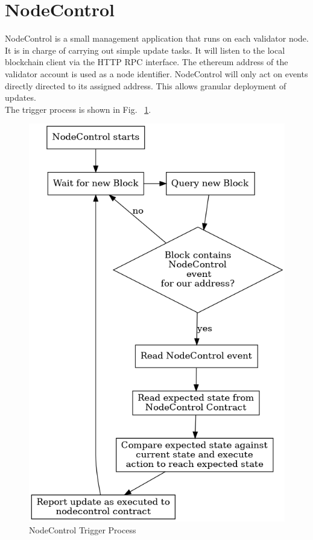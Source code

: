 \section{NodeControl}
\label{nodecontrol}

NodeControl is a small management application that runs on each validator node. It is in charge of carrying out simple update tasks.
It will listen to the local blockchain client via the HTTP RPC interface. 
The ethereum address of the validator account is used as a node identifier. NodeControl will only act on events directly directed to its assigned address.
This allows granular deployment of updates. \\

The trigger process is shown in Fig. ~\ref{fig:nctrigger}.


\begin{figure}[ht]
	\centering
    \includegraphics[height=0.65\textheight,keepaspectratio]{./images/nodecontrol.png}
	\caption{NodeControl Trigger Process}
	\label{fig:nctrigger}
\end{figure}

\newpage
